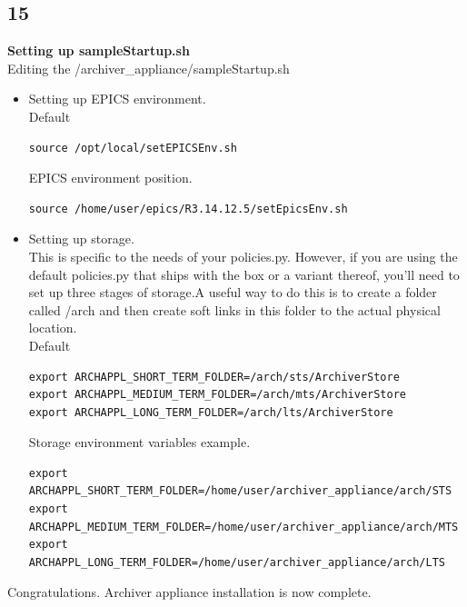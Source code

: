 \documentclass[11pt
  , a4paper
  , article
  , oneside
]{memoir}
\begin{document}
\subsection{15}
\textbf{Setting up sampleStartup.sh}\\
Editing the /archiver\_appliance/sampleStartup.sh
\begin{itemize}
	\item Setting up EPICS environment.\\
	Default
\begin{lstlisting}[style=termstyle]
source /opt/local/setEPICSEnv.sh
\end{lstlisting}
EPICS environment position.
\begin{lstlisting}[style=termstyle]
source /home/user/epics/R3.14.12.5/setEpicsEnv.sh
\end{lstlisting}
	\item Setting up storage.\\
This is specific to the needs of your policies.py. However, if you are using the default policies.py that ships with the box or a variant thereof, you'll need to set up three stages of storage.A useful way to do this is to create a folder called /arch and then create soft links in this folder to the actual physical location.\\
Default
\begin{lstlisting}[style=termstyle]
export ARCHAPPL_SHORT_TERM_FOLDER=/arch/sts/ArchiverStore
export ARCHAPPL_MEDIUM_TERM_FOLDER=/arch/mts/ArchiverStore
export ARCHAPPL_LONG_TERM_FOLDER=/arch/lts/ArchiverStore
\end{lstlisting}
Storage environment variables example.
\begin{lstlisting}[style=termstyle]
export ARCHAPPL_SHORT_TERM_FOLDER=/home/user/archiver_appliance/arch/STS
export ARCHAPPL_MEDIUM_TERM_FOLDER=/home/user/archiver_appliance/arch/MTS
export ARCHAPPL_LONG_TERM_FOLDER=/home/user/archiver_appliance/arch/LTS
\end{lstlisting}
\end{itemize}
Congratulations. Archiver appliance installation is now complete.
\end{document}
